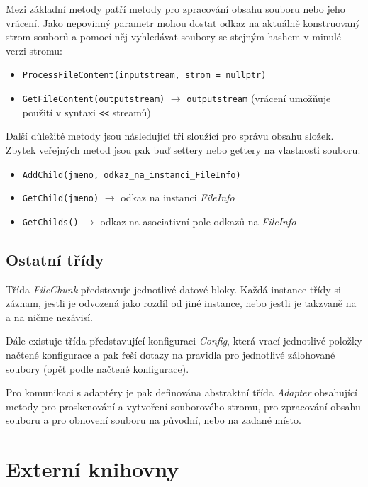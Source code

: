 Mezi základní metody patří metody pro zpracování obsahu souboru nebo jeho
vrácení. Jako nepovinný parametr mohou dostat odkaz na aktuálně konstruovaný
strom souborů a pomocí něj vyhledávat soubory se stejným hashem v minulé verzi
stromu:

\begin{itemize}
	\item\texttt{ProcessFileContent(inputstream, strom = nullptr)}
	\item\texttt{GetFileContent(outputstream)} $\rightarrow$
	\texttt{outputstream} (vrácení umožňuje použití v syntaxi \texttt{<\relax<} streamů)
\end{itemize}

Další důležité metody jsou následující tři sloužící pro správu obsahu složek.
Zbytek veřejných metod jsou pak buď settery nebo gettery na vlastnosti souboru:

\begin{itemize}
	\item\texttt{AddChild(jmeno, odkaz\_na\_instanci\_FileInfo)}
	\item\texttt{GetChild(jmeno)} $\rightarrow$ odkaz na instanci {\it FileInfo}
	\item\texttt{GetChilds()} $\rightarrow$ odkaz na asociativní pole odkazů
	na {\it FileInfo}
\end{itemize}

\subsection{Ostatní třídy}

Třída {\it FileChunk} představuje jednotlivé datové bloky. Každá instance třídy
si záznam, jestli je odvozená jako rozdíl od jiné instance, nebo jestli je
takzvaně na  a na ničme nezávisí.

Dále existuje třída představující konfiguraci {\it Config}, která vrací
jednotlivé položky načtené konfigurace a pak řeší dotazy na pravidla pro
jednotlivé zálohované soubory (opět podle načtené konfigurace).

Pro komunikaci s adaptéry je pak definována abstraktní třída {\it Adapter}
obsahující metody pro proskenování a vytvoření souborového stromu, pro
zpracování obsahu souboru a pro obnovení souboru na původní, nebo na zadané
místo.

\section{Externí knihovny}

